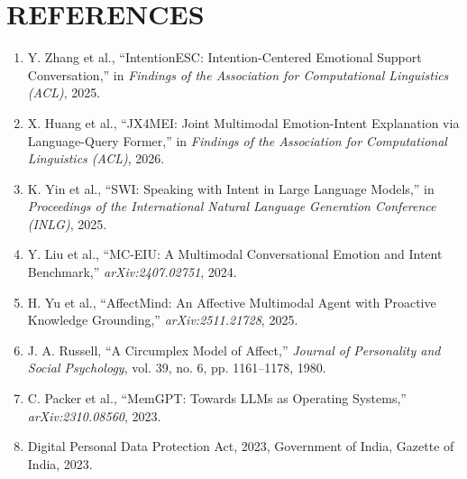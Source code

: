 \documentclass[12pt,a4paper]{article}
\begin{document}
\section{REFERENCES}
\begin{enumerate}
    \item Y. Zhang et al., ``IntentionESC: Intention-Centered Emotional Support Conversation,'' in \textit{Findings of the Association for Computational Linguistics (ACL)}, 2025.
    \item X. Huang et al., ``JX4MEI: Joint Multimodal Emotion-Intent Explanation via Language-Query Former,'' in \textit{Findings of the Association for Computational Linguistics (ACL)}, 2026.
    \item K. Yin et al., ``SWI: Speaking with Intent in Large Language Models,'' in \textit{Proceedings of the International Natural Language Generation Conference (INLG)}, 2025.
    \item Y. Liu et al., ``MC-EIU: A Multimodal Conversational Emotion and Intent Benchmark,'' \textit{arXiv:2407.02751}, 2024.
    \item H. Yu et al., ``AffectMind: An Affective Multimodal Agent with Proactive Knowledge Grounding,'' \textit{arXiv:2511.21728}, 2025.
    \item J. A. Russell, ``A Circumplex Model of Affect,'' \textit{Journal of Personality and Social Psychology}, vol. 39, no. 6, pp. 1161--1178, 1980.
    \item C. Packer et al., ``MemGPT: Towards LLMs as Operating Systems,'' \textit{arXiv:2310.08560}, 2023.
    \item Digital Personal Data Protection Act, 2023, Government of India, Gazette of India, 2023.
\end{enumerate}
\end{document}

